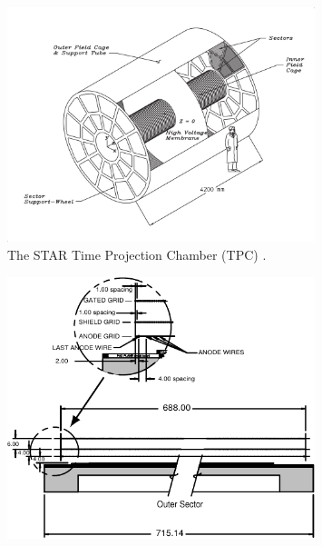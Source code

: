 \begin{figure}
\begin{centering}
\includegraphics[width=0.8\textwidth]{fig/2.Detector/TPC/tpcman}
\par\end{centering}

\protect\caption{The STAR Time Projection Chamber (TPC) \cite{Anderson2003659}.}


\label{fig:TPC}
\end{figure}
 

\begin{figure}
\begin{centering}
\includegraphics[width=0.8\textwidth]{fig/2.Detector/TPC/outer_wires}
\par\end{centering}

\protect\caption{}


\label{fig:outer_wires}
\end{figure}


